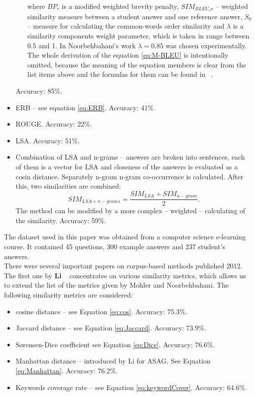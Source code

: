 \begin{itemize}
\begin{itemize}
\begin{equation}
\end{equation}
where $BP_r$ is a modified weighted brevity penalty, $SIM_{BLEU_ra}$ -- weighted similarity measure between a student answer and one reference answer, $S_0$ --  measure for calculating the common-words order similarity and $\lambda$ is a similarity components weight parameter, which is taken in range between 0.5 and 1. In Noorbehbahani's work $\lambda = 0.85$ was chosen experimentally. The whole derivation of the equation \ref{eq:M-BLEU} is intentionally omitted, because the meaning of the equation members is clear from the list items above and the formulas for them can be found in ~\cite{Noorbehbahani}.
\end{itemize}
Accuracy: 85\%.
\item ERB -- see equation \ref{eq:ERB}. Accuracy: 41\%.
\item ROUGE. Accuracy: 22\%.
\item LSA. Accuracy: 51\%.
\item Combination of LSA and n-grams -- answers are broken into sentences, each of them is a vector for LSA and closeness of the answers is evaluated as a cosin distance. Separately n-gram n-gram co-occurrence is calculated. After this, two similarities are combined:\\
\begin{equation} \label{eq:LSA+n-grams}
SIM_{LSA+n-grams} = \frac{SIM_{LSA} + SIM_{n-gram}}{2}.
\end{equation}
The method can be modified by a more complex -- weighted -- calculating of the similarity. Accuracy: 59\%.
\end{itemize}

The dataset used in this paper was obtained from a computer science e-learning course. It contained 45 questions, 300 example answers and 237 student's answers.\\

There were several important papers on corpus-based methods published 2012. The first one by \textbf{Li} ~\cite{Li} concentrates on various similarity metrics, which allows us to extend the list of the metrics given by Mohler and Noorbehbahani. The following similarity metrics are considered:

\begin{itemize}
\item cosine distance -- see Equation \ref{eq:cos}. Accuracy: 75.3\%.
\item Jaccard distance -- see Equation \ref{eq:Jaccard}. Accuracy: 73.9\%.
\item S{\o}rensen-Dice coefficient see Equation \ref{eq:Dice}. Accuracy: 76.6\%.
\item Manhattan distance -- introduced by Li for ASAG. See Equation \ref{eq:Manhattan}. Accuracy: 76.2\%.
\item Keywords coverage rate -- see Equation \ref{eq:keywordCover}. Accuracy: 64.6\%.
\end{itemize}

